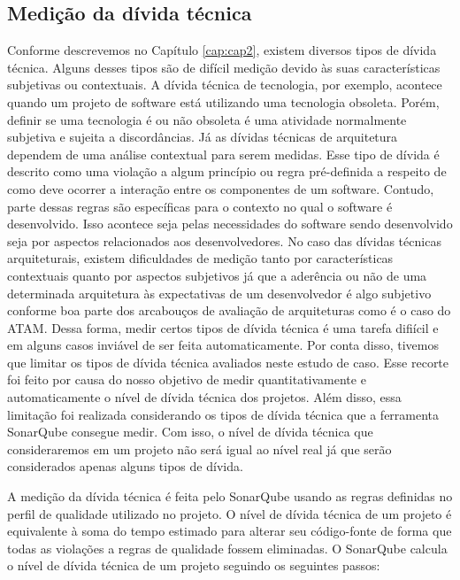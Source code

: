\subsection{Medição da dívida técnica}

Conforme descrevemos no Capítulo \ref{cap:cap2}, existem diversos tipos de dívida técnica. Alguns desses tipos são de difícil medição devido às suas características subjetivas ou contextuais. A dívida técnica de tecnologia, por exemplo, acontece quando um projeto de software está utilizando uma tecnologia obsoleta. Porém, definir se uma tecnologia é ou não obsoleta é uma atividade normalmente subjetiva e sujeita a discordâncias. Já as dívidas técnicas de arquitetura dependem de uma análise contextual para serem medidas.  Esse tipo de dívida é descrito como uma violação a algum princípio ou regra pré-definida a respeito de como deve ocorrer a interação entre os componentes de um software. Contudo, parte dessas regras são específicas para o contexto no qual o software é desenvolvido. Isso acontece seja pelas necessidades do software sendo desenvolvido seja por aspectos relacionados aos desenvolvedores. No caso das dívidas técnicas arquiteturais, existem dificuldades de medição tanto por características contextuais quanto por aspectos subjetivos já que a aderência ou não de uma determinada arquitetura às expectativas de um desenvolvedor é algo subjetivo conforme boa parte dos arcabouços de avaliação de arquiteturas como é o caso do ATAM\cite{kazman2000atam}. Dessa forma, medir certos tipos de dívida técnica é uma tarefa difiícil e em alguns casos inviável de ser feita automaticamente. Por conta disso,  tivemos que limitar os tipos de dívida técnica avaliados neste estudo de caso. Esse recorte foi feito por causa do nosso objetivo de medir quantitativamente e automaticamente o nível de dívida técnica dos projetos. Além disso, essa limitação foi realizada considerando os tipos de dívida técnica que a ferramenta SonarQube consegue medir. Com isso, o nível de dívida técnica que consideraremos em um projeto não será igual ao nível real já que serão considerados apenas alguns tipos de dívida.

A medição da dívida técnica é feita pelo SonarQube usando as regras definidas no perfil de qualidade utilizado no projeto. O nível de dívida técnica de um projeto é equivalente à soma do tempo estimado para alterar seu código-fonte de forma que todas as violações a regras de qualidade fossem eliminadas. O SonarQube calcula o nível de dívida técnica de um projeto seguindo os seguintes passos:

